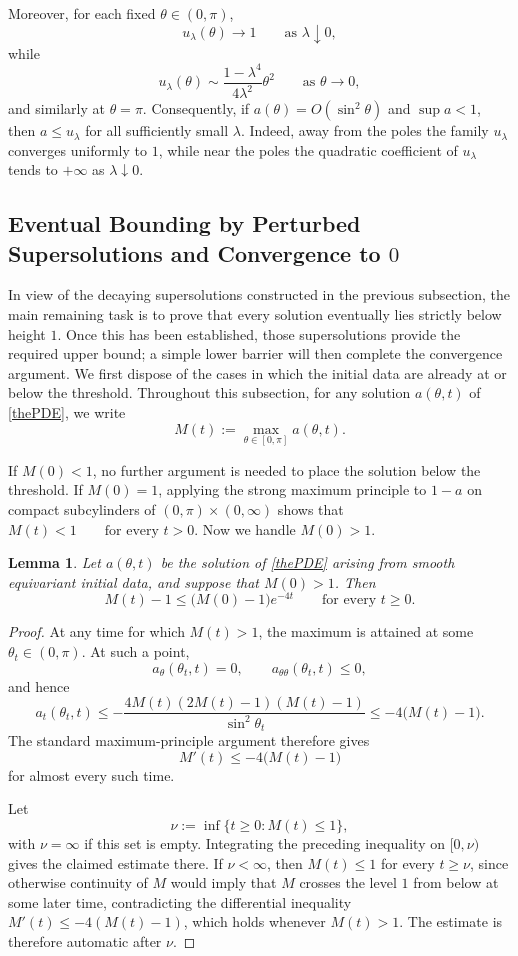 \documentclass[11pt,a4paper]{article}
\numberwithin{equation}{section}
\theoremstyle{plain}
\newtheorem{lemma}[theorem]{Lemma}
\theoremstyle{remark}
\begin{document}
Moreover, for each fixed $\theta\in(0,\pi)$,
$$
u_\lambda(\theta)\to1
\qquad\text{as }\lambda\downarrow0,
$$
while
$$
u_\lambda(\theta)\sim
\frac{1-\lambda^4}{4\lambda^2}\theta^2
\qquad\text{as }\theta\to0,
$$
and similarly at $\theta=\pi$. Consequently, if
$a(\theta)=O(\sin^2\theta)$ and $\sup a<1$, then
$a\le u_\lambda$ for all sufficiently small $\lambda$.
Indeed, away from the poles the family $u_\lambda$ converges uniformly
to $1$, while near the poles the quadratic coefficient of $u_\lambda$
tends to $+\infty$ as $\lambda\downarrow0$.

\subsection{Eventual Bounding by Perturbed Supersolutions and Convergence to $0$}

In view of the decaying supersolutions constructed in the previous subsection, the main
remaining task is to prove that every solution eventually lies strictly below height $1$.
Once this has been established, those supersolutions provide the required upper bound;
a simple lower barrier will then complete the convergence argument. We first dispose of
the cases in which the initial data are already at or below the threshold. Throughout this subsection, for any solution $a(\theta,t)$ of \eqref{thePDE}, we write
$$
M(t):=\max_{\theta\in[0,\pi]}a(\theta,t).
$$

If $M(0)<1$, no further argument is needed to place the solution below the threshold. If $M(0)=1$, applying
the strong maximum principle to $1-a$ on compact subcylinders of
$(0,\pi)\times(0,\infty)$ shows that $M(t)<1 \qquad \text{for every } t>0$. Now we handle $M(0)>1$.

\begin{lemma}\label{supdecaylem}
Let $a(\theta,t)$ be the solution of \eqref{thePDE} arising from smooth equivariant
initial data, and suppose that $M(0)>1$. Then
$$
M(t)-1\leq \bigl(M(0)-1\bigr)e^{-4t}
\qquad\text{for every }t\geq 0.
$$
\end{lemma}

\begin{proof}
At any time for which $M(t)>1$, the maximum is attained at some
$\theta_t\in(0,\pi)$. At such a point,
$$
a_\theta(\theta_t,t)=0,
\qquad
a_{\theta\theta}(\theta_t,t)\leq 0,
$$
and hence
$$
a_t(\theta_t,t)
\leq
-\frac{4M(t)(2M(t)-1)(M(t)-1)}{\sin^2\theta_t}
\leq -4\bigl(M(t)-1\bigr).
$$
The standard maximum-principle argument therefore gives
$$
M'(t)\leq -4\bigl(M(t)-1\bigr)
$$
for almost every such time.

Let
$$
\nu:=\inf\{t\geq 0:M(t)\leq 1\},
$$
with $\nu=\infty$ if this set is empty. Integrating the preceding inequality on $[0,\nu)$ gives the claimed estimate
there. If $\nu<\infty$, then $M(t)\leq1$ for every $t\geq\nu$, since otherwise
continuity of $M$ would imply that $M$ crosses the level $1$ from below at some
later time, contradicting the differential inequality
$M'(t)\leq-4(M(t)-1)$, which holds whenever $M(t)>1$. The estimate is therefore
automatic after $\nu$.
\end{proof}
\end{document}
